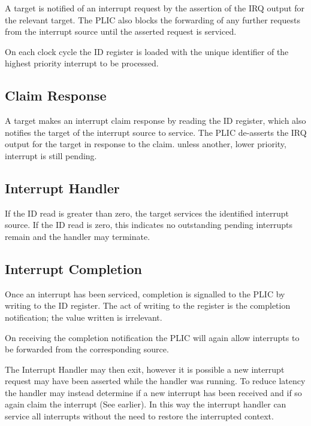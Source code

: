 A target is notified of an interrupt request by the assertion of the IRQ
output for the relevant target. The PLIC also blocks the forwarding of
any further requests from the interrupt source until the asserted
request is serviced.

On each clock cycle the ID register is loaded with the unique identifier
of the highest priority interrupt to be processed.

\subsection{Claim Response} \label{sec:claim-response}

A target makes an interrupt claim response by reading the ID register,
which also notifies the target of the interrupt source to service. The
PLIC de-asserts the IRQ output for the target in response to the claim.
unless another, lower priority, interrupt is still pending.

\subsection{Interrupt Handler}

If the ID read is greater than zero, the target services the identified
interrupt source. If the ID read is zero, this indicates no outstanding
pending interrupts remain and the handler may terminate.

\subsection{Interrupt Completion}

Once an interrupt has been serviced, completion is signalled to the PLIC
by writing to the ID register. The act of writing to the register is the
completion notification; the value written is irrelevant.

On receiving the completion notification the PLIC will again allow
interrupts to be forwarded from the corresponding source.

The Interrupt Handler may then exit, however it is possible a new
interrupt request may have been asserted while the handler was running.
To reduce latency the handler may instead determine if a new interrupt
has been received and if so again claim the interrupt (See earlier). In this
way the interrupt handler can service all interrupts without the need to
restore the interrupted context.
